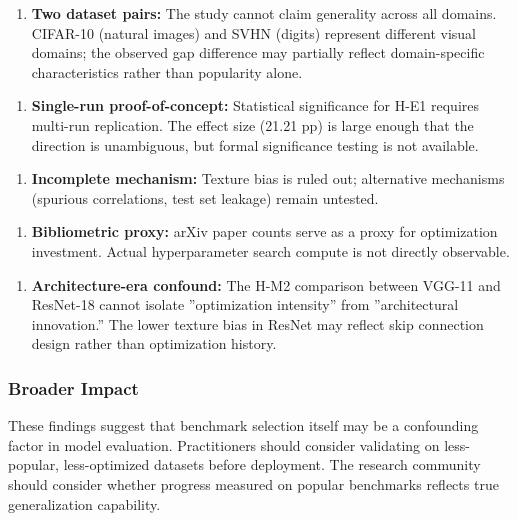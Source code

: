 \begin{enumerate}
\item \textbf{Two dataset pairs:} The study cannot claim generality across all domains. CIFAR-10 (natural images) and SVHN (digits) represent different visual domains; the observed gap difference may partially reflect domain-specific characteristics rather than popularity alone.
\end{enumerate}

\begin{enumerate}
\item \textbf{Single-run proof-of-concept:} Statistical significance for H-E1 requires multi-run replication. The effect size (21.21 pp) is large enough that the direction is unambiguous, but formal significance testing is not available.
\end{enumerate}

\begin{enumerate}
\item \textbf{Incomplete mechanism:} Texture bias is ruled out; alternative mechanisms (spurious correlations, test set leakage) remain untested.
\end{enumerate}

\begin{enumerate}
\item \textbf{Bibliometric proxy:} arXiv paper counts serve as a proxy for optimization investment. Actual hyperparameter search compute is not directly observable.
\end{enumerate}

\begin{enumerate}
\item \textbf{Architecture-era confound:} The H-M2 comparison between VGG-11 and ResNet-18 cannot isolate ''optimization intensity'' from ''architectural innovation.'' The lower texture bias in ResNet may reflect skip connection design rather than optimization history.
\end{enumerate}

\subsubsection{Broader Impact}

These findings suggest that benchmark selection itself may be a confounding factor in model evaluation. Practitioners should consider validating on less-popular, less-optimized datasets before deployment. The research community should consider whether progress measured on popular benchmarks reflects true generalization capability.

